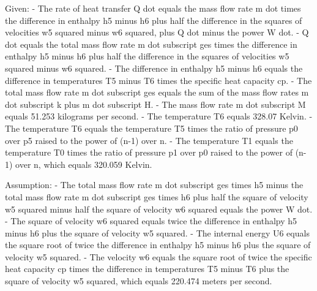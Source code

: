 Given:
- The rate of heat transfer Q dot equals the mass flow rate m dot times the difference in enthalpy h5 minus h6 plus half the difference in the squares of velocities w5 squared minus w6 squared, plus Q dot minus the power W dot.
- Q dot equals the total mass flow rate m dot subscript ges times the difference in enthalpy h5 minus h6 plus half the difference in the squares of velocities w5 squared minus w6 squared.
- The difference in enthalpy h5 minus h6 equals the difference in temperatures T5 minus T6 times the specific heat capacity cp.
- The total mass flow rate m dot subscript ges equals the sum of the mass flow rates m dot subscript k plus m dot subscript H.
- The mass flow rate m dot subscript M equals 51.253 kilograms per second.
- The temperature T6 equals 328.07 Kelvin.
- The temperature T6 equals the temperature T5 times the ratio of pressure p0 over p5 raised to the power of (n-1) over n.
- The temperature T1 equals the temperature T0 times the ratio of pressure p1 over p0 raised to the power of (n-1) over n, which equals 320.059 Kelvin.

Assumption:
- The total mass flow rate m dot subscript ges times h5 minus the total mass flow rate m dot subscript ges times h6 plus half the square of velocity w5 squared minus half the square of velocity w6 squared equals the power W dot.
- The square of velocity w6 squared equals twice the difference in enthalpy h5 minus h6 plus the square of velocity w5 squared.
- The internal energy U6 equals the square root of twice the difference in enthalpy h5 minus h6 plus the square of velocity w5 squared.
- The velocity w6 equals the square root of twice the specific heat capacity cp times the difference in temperatures T5 minus T6 plus the square of velocity w5 squared, which equals 220.474 meters per second.